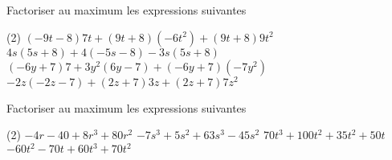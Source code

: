 \documentclass[a4paper,12pt]{report}
\begin{document}
\begin{auto}Factoriser au maximum les expressions suivantes

\begin{tasks}(2)
	\task $(-9 t-8 )7 t+(9 t + 8 )\left(-6 t^2\right)+(9 t + 8 )9 t^2$
	\task $4 s(5 s + 8 )+4 (-5 s-8 )-3 s(5 s + 8 )$
	\task $(-6 y + 7 )7 +3 y^2(6 y-7 )+(-6 y + 7 )\left(-7 y^2\right)$
	\task $-2 z(-2 z-7 )+(2 z + 7 )3 z+(2 z + 7 )7 z^2$
\end{tasks}
\end{auto}

\begin{auto}Factoriser au maximum les expressions suivantes

\begin{tasks}(2)
	\task $-4 r-40  + 8 r^3 + 80 r^2$
	\task $-7 s^3 + 5 s^2 + 63 s^3-45 s^2$
	\task $70 t^3 + 100 t^2 + 35 t^2 + 50 t$
	\task $-60 t^2-70 t + 60 t^3 + 70 t^2$
\end{tasks}
\end{auto}
\end{document}
